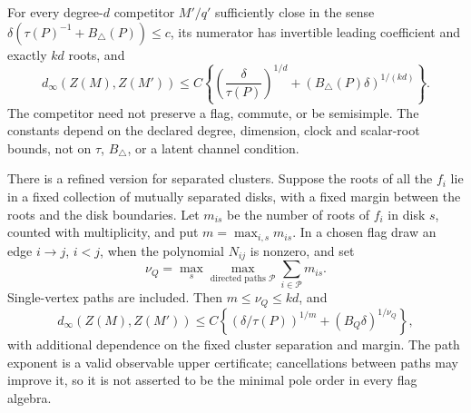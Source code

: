\begin{theorem}\label{thm:flag-gauge}
For every degree-$d$ competitor $M'/q'$ sufficiently close in the
sense $\delta(\tau(P)^{-1}+B_\triangle(P))\le c$, its numerator has
invertible leading coefficient and exactly $kd$ roots, and
\begin{equation}\label{eq:flag-additive}
 d_\infty(Z(M),Z(M'))
 \le C\left\{\left(\frac{\delta}{\tau(P)}\right)^{1/d}
                 +(B_\triangle(P)\delta)^{1/(kd)}\right\}.
\end{equation}
The competitor need not preserve a flag, commute, or be semisimple.
The constants depend on the declared degree, dimension, clock and
scalar-root bounds, not on $\tau$, $B_\triangle$, or a latent channel
condition.

There is a refined version for separated clusters. Suppose the roots
of all the $f_i$ lie in a fixed collection of mutually separated disks,
with a fixed margin between the roots and the disk boundaries. Let
$m_{is}$ be the number of roots of $f_i$ in disk $s$, counted with
multiplicity, and put $m=\max_{i,s}m_{is}$. In a chosen flag draw an
edge $i\to j$, $i<j$, when the polynomial $N_{ij}$ is nonzero, and set
\begin{equation}\label{eq:flag-path-order}
 \nu_Q=\max_s\max_{\text{directed paths }\mathcal P}
                         \sum_{i\in\mathcal P}m_{is}.
\end{equation}
Single-vertex paths are included. Then $m\le\nu_Q\le kd$, and
\begin{equation}\label{eq:flag-cluster}
 d_\infty(Z(M),Z(M'))
 \le C\left\{(\delta/\tau(P))^{1/m}
                         +(B_Q\delta)^{1/\nu_Q}\right\},
\end{equation}
with additional dependence on the fixed cluster separation and margin.
The path exponent is a valid observable upper certificate; cancellations
between paths may improve it, so it is not asserted to be the minimal
pole order in every flag algebra.
\end{theorem}
